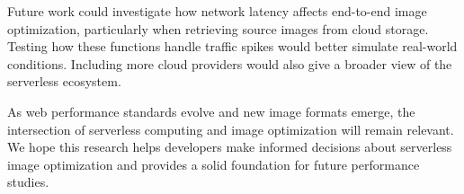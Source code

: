 Future work could investigate how network latency affects end-to-end image optimization, particularly when retrieving source images from cloud storage. Testing how these functions handle traffic spikes would better simulate real-world conditions. Including more cloud providers would also give a broader view of the serverless ecosystem.

As web performance standards evolve and new image formats emerge, the intersection of serverless computing and image optimization will remain relevant. We hope this research helps developers make informed decisions about serverless image optimization and provides a solid foundation for future performance studies.
